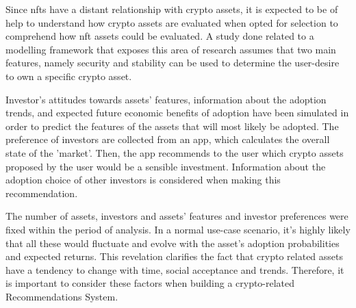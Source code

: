 \bigbreak

Since \gls{nft}s have a distant relationship with crypto assets, it is expected to be of help to understand how crypto assets are evaluated when opted for selection to comprehend how \gls{nft} assets could be evaluated. A study done related to a modelling framework that exposes this area of research \autocite{bartolucci_model_2020} assumes that two main features, namely security and stability can be used to determine the user-desire to own a specific crypto asset. 

Investor's attitudes towards assets’ features, information about the adoption trends, and expected future economic benefits of adoption have been simulated in order to predict the features of the assets that will most likely be adopted. The preference of investors are collected from an app, which calculates the overall state of the 'market'. Then, the app recommends to the user which crypto assets proposed by the user would be a sensible investment. Information about the adoption choice of other investors is considered when making this recommendation.

The number of assets, investors and assets' features and investor preferences were fixed within the period of analysis. In a normal use-case scenario, it's highly likely that all these would fluctuate and evolve with the asset's adoption probabilities and expected returns. This revelation clarifies the fact that crypto related assets have a tendency to change with time, social acceptance and trends. Therefore, it is important to consider these factors when building a crypto-related Recommendations System.









